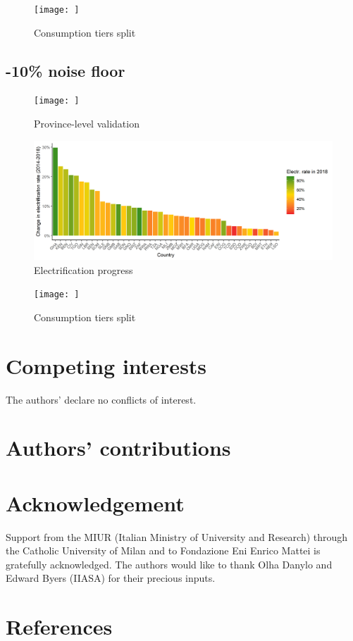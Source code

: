 \documentclass[preprint,12pt]{elsarticle}
\begin{document}
\begin{figure}[H]
    \centering
    \texttt{[image: ]}
    \caption{Consumption tiers split}
\end{figure}


\subsection*{-10\% noise floor}

\begin{figure}[H]
    \centering
    \texttt{[image: ]}
    \caption{Province-level validation}
\end{figure}

\begin{figure}[H]
    \centering
    \includegraphics[scale=0.7]{figures/barplot_minus10.png}
    \caption{Electrification progress}
\end{figure}

\begin{figure}[H]
    \centering
    \texttt{[image: ]}
    \caption{Consumption tiers split}
\end{figure}


\section*{Competing interests}
The authors' declare no conflicts of interest. 

\section*{Authors' contributions}

\section*{Acknowledgement}
Support from the MIUR (Italian Ministry of University and Research) through the Catholic University of Milan and to Fondazione Eni Enrico Mattei is gratefully acknowledged. The authors would like to thank Olha Danylo and Edward Byers (IIASA) for their precious inputs.

\section*{References}
\begin{footnotesize}

\end{footnotesize}
\end{document}
